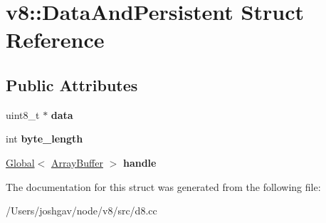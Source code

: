 \hypertarget{structv8_1_1_data_and_persistent}{}\section{v8\+:\+:Data\+And\+Persistent Struct Reference}
\label{structv8_1_1_data_and_persistent}
\subsection*{Public Attributes}
\begin{DoxyCompactItemize}
\item 
uint8\+\_\+t $\ast$ {\bfseries data}\hypertarget{structv8_1_1_data_and_persistent_a56a66b5345eabc97cf7535b9c2f35e83}{}\label{structv8_1_1_data_and_persistent_a56a66b5345eabc97cf7535b9c2f35e83}

\item 
int {\bfseries byte\+\_\+length}\hypertarget{structv8_1_1_data_and_persistent_ac5da91ed58368a7925f804a9c025d9b0}{}\label{structv8_1_1_data_and_persistent_ac5da91ed58368a7925f804a9c025d9b0}

\item 
\hyperlink{classv8_1_1_global}{Global}$<$ \hyperlink{classv8_1_1_array_buffer}{Array\+Buffer} $>$ {\bfseries handle}\hypertarget{structv8_1_1_data_and_persistent_a7eb39acbec0b503b6321295537e738e6}{}\label{structv8_1_1_data_and_persistent_a7eb39acbec0b503b6321295537e738e6}

\end{DoxyCompactItemize}


The documentation for this struct was generated from the following file\+:\begin{DoxyCompactItemize}
\item 
/\+Users/joshgav/node/v8/src/d8.\+cc\end{DoxyCompactItemize}
